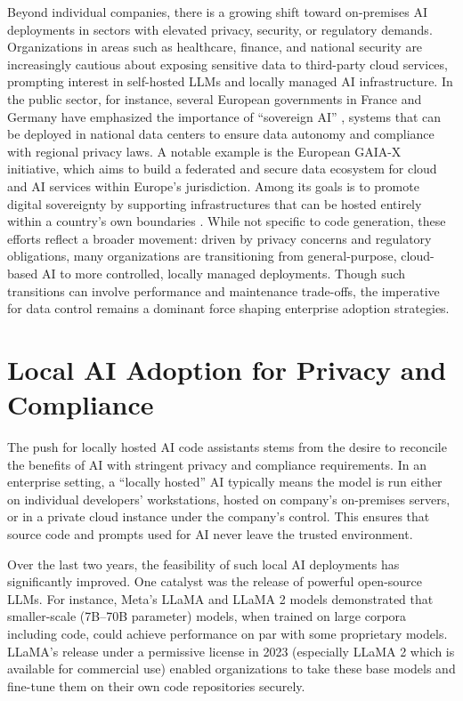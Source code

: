 Beyond individual companies, there is a growing shift toward on-premises \gls{AI} deployments in sectors with elevated privacy, security, or regulatory demands. Organizations in areas such as healthcare, finance, and national security are increasingly cautious about exposing sensitive data to third-party cloud services, prompting interest in self-hosted \glspl{LLM} and locally managed \gls{AI} infrastructure. In the public sector, for instance, several European governments in France and Germany have emphasized the importance of ``sovereign AI'' ,  systems that can be deployed in national data centers to ensure data autonomy and compliance with regional privacy laws. A notable example is the European GAIA-X initiative, which aims to build a federated and secure data ecosystem for cloud and \gls{AI} services within Europe’s jurisdiction. Among its goals is to promote digital sovereignty by supporting infrastructures that can be hosted entirely within a country’s own boundaries \autocite{GaiaXHub2024}. While not specific to code generation, these efforts reflect a broader movement: driven by privacy concerns and regulatory obligations, many organizations are transitioning from general-purpose, cloud-based \gls{AI} to more controlled, locally managed deployments. Though such transitions can involve performance and maintenance trade-offs, the imperative for data control remains a dominant force shaping enterprise adoption strategies.

\section{Local AI Adoption for Privacy and Compliance}
\label{sec:local-ai-for-privacy}
The push for locally hosted \gls{AI} code assistants stems from the desire to reconcile the benefits of \gls{AI} with stringent privacy and compliance requirements. In an enterprise setting, a ``locally hosted'' \gls{AI} typically means the model is run either on individual developers’ workstations, hosted on  company’s on-premises servers, or in a private cloud instance under the company’s control. This ensures that source code and prompts used for \gls{AI} never leave the trusted environment.

Over the last two years, the feasibility of such local \gls{AI} deployments has significantly improved. One catalyst was the release of powerful open-source \glspl{LLM}. For instance, Meta’s LLaMA and LLaMA 2 models \autocite{Touvron2023} demonstrated that smaller-scale (7B--70B parameter) models, when trained on large corpora including code, could achieve performance on par with some proprietary models. LLaMA’s release under a permissive license in 2023 (especially LLaMA 2 which is available for commercial use) enabled organizations to take these base models and fine-tune them on their own code repositories securely.

